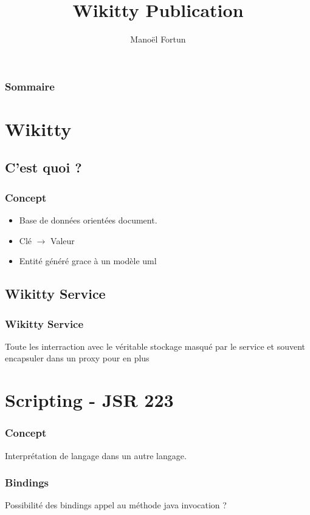 \documentclass[12pt,a4paper,utf8x]{beamer}
\begin{document}
\title{Wikitty Publication}  
\author{Manoël Fortun}

\begin{frame}
\titlepage
\end{frame}

\begin{frame}\frametitle{Sommaire}\tableofcontents
\end{frame} 


\section{Wikitty} 
\subsection{C'est quoi ?}
\begin{frame}\frametitle{Concept} 
\begin{itemize}
\item Base de données orientées document.
\item Clé $\to$ Valeur
\item Entité généré grace à un modèle uml
\end{itemize}
\end{frame}

\subsection{Wikitty Service}
\begin{frame} \frametitle{Wikitty Service} 
Toute les interraction avec le véritable stockage masqué par le service
et souvent encapsuler dans un proxy pour en plus 

\end{frame}


\section{Scripting - JSR 223} 
\begin{frame}\frametitle{Concept}
Interprétation de langage dans un autre langage.




\end{frame}

\begin{frame}\frametitle{Bindings}
Possibilité des bindings
appel au méthode java
invocation
?


\end{frame}
\end{document}
